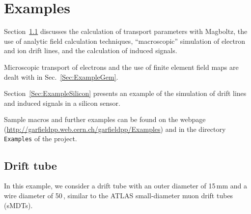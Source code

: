 \section{Examples}

Section~\ref{Sec:ExampleTube} discusses the 
calculation of transport parameters with Magboltz, 
the use of analytic field calculation techniques, 
``macroscopic'' simulation of electron and ion drift lines, 
and the calculation of induced signals. 
 
Microscopic transport of electrons and 
the use of finite element field maps are dealt with in 
Sec.~\ref{Sec:ExampleGem}. 

Section~\ref{Sec:ExampleSilicon} presents an example of 
the simulation of drift lines and induced signals in a 
silicon sensor.
 
Sample macros and further examples can be found on the webpage 
(\url{http://garfieldpp.web.cern.ch/garfieldpp/Examples}) and 
in the directory \texttt{Examples} of the project.
 
\subsection{Drift tube}\label{Sec:ExampleTube}
In this example, we consider a drift tube with an outer diameter of 
15\,mm and a wire diameter of 50\,, similar to the 
ATLAS small-diameter muon drift tubes (sMDTs).

